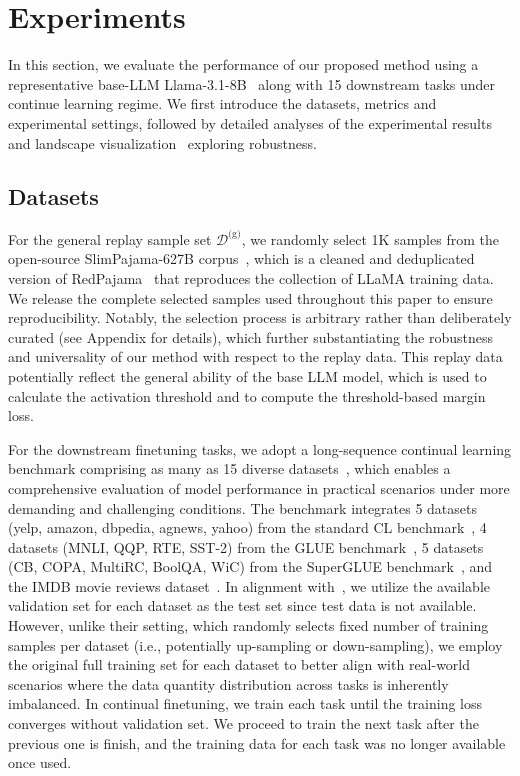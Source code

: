 \section{Experiments}\label{sec:Experiments}
In this section, we evaluate the performance of our proposed method using a representative base-LLM Llama-3.1-8B~\cite{grattafiori2024llama} along with 15 downstream tasks under continue learning regime. We first introduce the datasets, metrics and experimental settings, followed by detailed analyses of the experimental results and landscape visualization~\cite{li2018visualizing,wang2024comprehensive} exploring robustness.



\subsection{Datasets}
For the general replay sample set $\mathcal{D}^{\text{(g)}}$, we randomly select 1K samples from the open-source SlimPajama-627B corpus~\cite{cerebras2023slimpajama}, which is a cleaned and deduplicated version of RedPajama~\cite{weber2024redpajama} that reproduces the collection of LLaMA training data.
We release the complete selected samples used throughout this paper to ensure reproducibility. Notably, the selection process is arbitrary rather than deliberately curated (see Appendix for details), which further substantiating the robustness and universality of our method with respect to the replay data.
This replay data potentially reflect the general ability of the base LLM model, which is used to calculate the activation threshold and to compute the threshold-based margin loss.

For the downstream finetuning tasks, we adopt a long-sequence continual learning benchmark comprising as many as 15 diverse datasets~\cite{razdaibiedina2023progressive}, which enables a comprehensive evaluation of model performance in practical scenarios under more demanding and challenging conditions.
The benchmark integrates 5 datasets (yelp, amazon, dbpedia, agnews, yahoo) from the standard CL benchmark~\cite{zhang2015character,qin2021lfpt5}, 4 datasets (MNLI, QQP, RTE, SST-2) from the GLUE benchmark~\cite{wang2018glue}, 5 datasets (CB, COPA, MultiRC, BoolQA, WiC) from the SuperGLUE benchmark~\cite{wang2019superglue}, and the IMDB movie reviews dataset~\cite{maas2011learning}.
In alignment with~\cite{razdaibiedina2023progressive}, we utilize the available validation set for each dataset as the test set since test data is not available.
However, unlike their setting, which randomly selects fixed number of training samples per dataset (i.e., potentially up-sampling or down-sampling), we employ the original full training set for each dataset to better align with real-world scenarios where the data quantity distribution across tasks is inherently imbalanced.
In continual finetuning, we train each task until the training loss converges without validation set.
We proceed to train the next task after the previous one is finish, and the training data for each task was no longer available once used.

